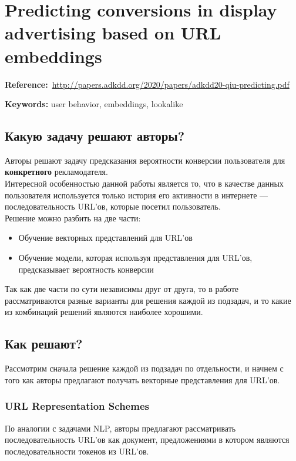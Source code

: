 \chapter{Predicting conversions in display advertising based on URL embeddings}
\textbf{Reference:}~\url{http://papers.adkdd.org/2020/papers/adkdd20-qiu-predicting.pdf}

\textbf{Keywords:} user behavior, embeddings, lookalike

\section{Какую задачу решают авторы?}

Авторы решают задачу предсказания вероятности конверсии пользователя для \textbf{конкретного} рекламодателя. \\

Интересной особенностью данной работы является то, что в качестве данных пользователя используется только история его активности в интернете --- последовательность URL'ов, которые посетил пользователь. \\

Решение можно разбить на две части:
\begin{itemize}
    \item Обучение векторных представлений для URL'ов
    \item Обучение модели, которая используя представления для URL'ов, предсказывает вероятность конверсии
\end{itemize}

Так как две части по сути независимы друг от друга, то в работе рассматриваются разные варианты для решения каждой из подзадач, и то какие из комбинаций решений являются наиболее хорошими.

\section{Как решают?}

Рассмотрим сначала решение каждой из подзадач по отдельности, и начнем с того как авторы предлагают получать векторные представления для URL'ов.

\subsection{URL Representation Schemes}

По аналогии с задачами NLP, авторы предлагают рассматривать последовательность URL'ов как документ, предложениями в котором являются последовательности токенов из URL'ов.

